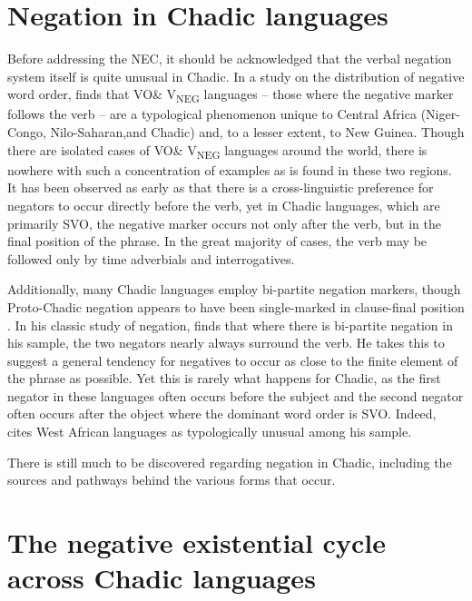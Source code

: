 \documentclass[output=paper]{langsci/langscibook}
\begin{document}
\section{Negation in Chadic languages}\label{sec:3:2}

Before addressing the NEC, it should be acknowledged that the verbal
negation system itself is quite unusual in Chadic. In a study on the
distribution of negative word order, \citet{Dryer2009} finds that VO\&
V\textsubscript{NEG} languages -- those where the negative marker follows
the verb -- are a typological phenomenon unique to Central Africa
(Niger-Congo, Nilo-Saharan,and Chadic) and, to a
lesser extent, to New Guinea. Though there are isolated cases of VO\&
V\textsubscript{NEG} languages around the world, there is nowhere with such
a concentration of examples as is found in these two regions. It has been
observed as early as \citet{Jespersen1917} that there is a cross-linguistic
preference for negators to occur directly before the verb, yet in Chadic
languages, which are primarily SVO, the negative marker occurs not only
after the verb, but in the final position of the phrase. In the great
majority of cases, the verb may be followed only by time adverbials and
interrogatives. 

Additionally, many Chadic languages employ bi-partite negation
markers,
\linebreak{}
though Proto-Chadic negation appears to have been single-mar\-ked in clau\-se-fi\-nal
position \citep{Newman1977}. In his classic study of negation,
\citet{Dahl1979} finds that where there is bi-par\-ti\-te negation in his sample,
the two negators nearly always surround the verb. He takes this to suggest
a general tendency for negatives to occur as close to the finite element of
the phrase as possible. Yet this is rarely what happens
 for Chadic, as the
first negator in these languages often occurs before the subject and the second
negator often occurs after the object where the dominant word order is SVO.
Indeed, \citet{Dahl1979} cites West African languages as typologically
unusual among his sample.

There is still much to be discovered regarding negation in Chadic, including the sources and pathways behind the various forms that occur.

\section{The negative existential cycle across Chadic languages}\label{sec:3:3}
\end{document}
